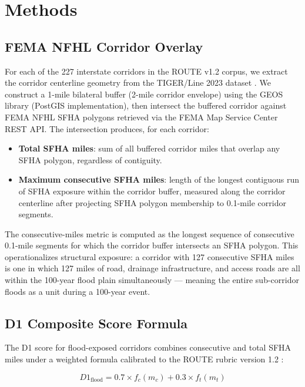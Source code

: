 \section{Methods}

\subsection{FEMA NFHL Corridor Overlay}

For each of the 227 interstate corridors in the ROUTE v1.2 corpus, we extract the corridor
centerline geometry from the TIGER/Line 2023 dataset \citep{ROUTE_A1}. We construct a 1-mile
bilateral buffer (2-mile corridor envelope) using the GEOS library (PostGIS implementation),
then intersect the buffered corridor against FEMA NFHL SFHA polygons retrieved via the FEMA
Map Service Center REST API. The intersection produces, for each corridor:

\begin{itemize}
\item \textbf{Total SFHA miles}: sum of all buffered corridor miles that overlap any SFHA
polygon, regardless of contiguity.
\item \textbf{Maximum consecutive SFHA miles}: length of the longest contiguous run of
SFHA exposure within the corridor buffer, measured along the corridor centerline after
projecting SFHA polygon membership to 0.1-mile corridor segments.
\end{itemize}

The consecutive-miles metric is computed as the longest sequence of consecutive 0.1-mile
segments for which the corridor buffer intersects an SFHA polygon. This operationalizes
structural exposure: a corridor with 127 consecutive SFHA miles is one in which 127 miles
of road, drainage infrastructure, and access roads are all within the 100-year flood plain
simultaneously --- meaning the entire sub-corridor floods as a unit during a 100-year event.

\subsection{D1 Composite Score Formula}

The D1 score for flood-exposed corridors combines consecutive and total SFHA miles under a
weighted formula calibrated to the ROUTE rubric version 1.2 \citep{ROUTE_D1}:

\begin{equation}
D1_{\text{flood}} = 0.7 \times f_c(m_c) + 0.3 \times f_t(m_t)
\end{equation}


